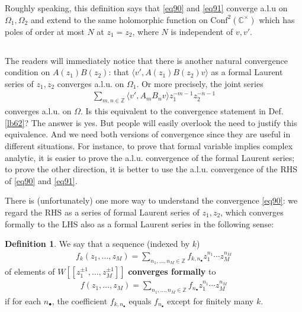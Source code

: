 \documentclass[11pt,b5paper,notitlepage]{article}
\theoremstyle{definition}
\newtheorem{df}{Definition}[section]
\theoremstyle{plain}
\newcommand{\Conf}{\mathrm{Conf}}
\newcommand{\bk}[1]{\langle {#1}\rangle}
\newcommand{\blt}{\bullet}
\newcommand{\Cbb}{\mathbb C}
\newcommand{\Zbb}{\mathbb Z}
\numberwithin{equation}{section}
\begin{document}
Roughly speaking, this definition says that \eqref{eq90} and \eqref{eq91} converge a.l.u on $\Omega_1,\Omega_2$ and extend to the same holomorphic function on $\Conf^2(\Cbb^\times)$ which has poles of order at most $N$ at $z_1=z_2$, where $N$ is independent of $v,v'$.




\subsection{}

The readers will immediately notice that there is another natural convergence condition on $A(z_1)B(z_2)$: that $\bk{v',A(z_1)B(z_2)v}$ as a formal Laurent series of $z_1,z_2$ converges a.l.u. on $\Omega_1$. Or  more precisely, the joint series
\begin{align}
\sum_{m,n\in\Zbb}\bk{v',A_mB_nv}z_1^{-m-1}z_2^{-n-1}\label{eq96}	
\end{align}
converges a.l.u. on $\Omega$. Is this equivalent to the convergence statement in Def. \ref{lb62}? The answer is yes. But people will easily overlook the need to justify this equivalence. And we need both versions of convergence since they are useful in different situations. For instance, to prove that formal variable implies complex analytic, it is easier to prove the a.l.u. convergence of the formal Laurent series; to prove the other direction, it is better to use the a.l.u. convergence of the RHS of \eqref{eq90} and \eqref{eq91}.

There is (unfortunately) one more way to understand the convergence \eqref{eq90}: we regard the RHS as a series of formal Laurent series of $z_1,z_2$, which converges formally to the LHS also as a formal Laurent series in the following sense:


\begin{df}\label{lb66}
	We say that a sequence (indexed by $k$)
	\begin{align*}
		f_k(z_1,\dots,z_M)=\sum_{n_1,\dots,n_M\in\Zbb}f_{k,n_\blt}z_1^{n_1}\cdots z_M^{n_M}	
	\end{align*}
	of elements of $W[[z_1^{\pm1},\dots,z_M^{\pm1}]]$ \textbf{converges formally} to
	\begin{align*}
		f(z_1,\dots,z_M)=\sum_{n_1,\dots,n_M\in\Zbb}f_{n_\blt}z_1^{n_1}\cdots z_M^{n_M}	
	\end{align*}
	if for each $n_\blt$, the coefficient $f_{k,n_\blt}$ equals $f_{n_\blt}$ except for finitely many $k$.
\end{df}
\end{document}
